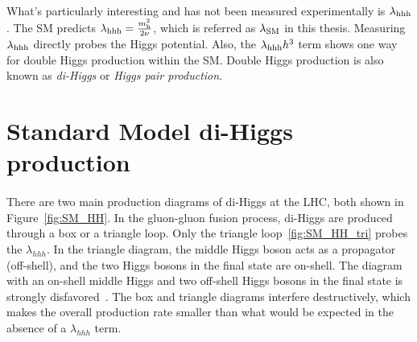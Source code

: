 \paragraph{}
What's particularly interesting and has not been measured experimentally is $\lambda_{\rm hhh}$. 
The SM predicts $\lambda_{\rm hhh} = \frac{m_{\rm h}^2}{2\rm\nu}$, which is referred as \textbf{$\lambda_{\rm SM}$} in this thesis. 
Measuring $\lambda_{\rm hhh}$ directly probes the Higgs potential.
Also, the $\lambda_{\rm hhh}h^3$ term shows one way for double Higgs production within the SM. Double Higgs production is also known as \textit{di-Higgs} or \textit{Higgs pair production}.


\section{Standard Model di-Higgs production}



\paragraph{}
There are two main production diagrams of di-Higgs at the LHC, both shown in Figure~\ref{fig:SM_HH}. In the gluon-gluon  fusion process, di-Higgs are produced through a box or a triangle loop. 
Only the triangle loop~\ref{fig:SM_HH_tri} probes the $\lambda_{hhh}$. 
In the triangle diagram, the middle Higgs boson acts as a propagator (off-shell), and the two Higgs bosons in the final state are on-shell. 
The diagram with an on-shell middle Higgs and two off-shell Higgs bosons in the final state is strongly disfavored~\cite{Pdg}.
The box and triangle diagrams interfere destructively, which makes the overall production rate smaller than what would be expected in the absence of a $\lambda_{hhh}$ term.

